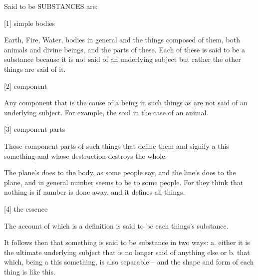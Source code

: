 
Said to be SUBSTANCES are:

[1]     simple bodies

        Earth, Fire, Water, bodies in general and
        the things composed of them, both animals and divine beings,
        and the parts of these.  Each of these is said to be a substance
        because it is not said of an underlying subject but rather the
        other things are said of it.

[2]     component

        Any component that is the cause of a being in such things
        as are not said of an underlying subject. For example, 
        the soul in the case of an animal.

[3]     component parts

        Those component parts of such things that define them and
        signify a this something and whose destruction destroys the whole.

        The plane's does to the body, as some people say, and
        the line's does to the plane, and in general number seems to be 
        to some people. For they think that nothing is if number is done away,
        and it defines all things.

[4]     the essence

        The account of which is a definition is said to be each things's substance.

It follows then that something is said to be substance in two ways:
a. either it is the ultimate underlying subject that is 
no longer said of anything else or
b. that which, being a this something, is also separable --
and the shape and form of each thing is like this.
